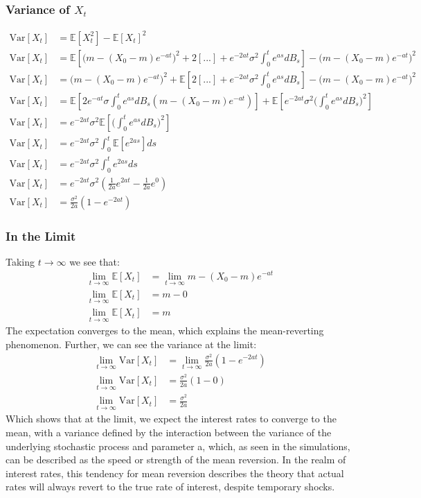 \documentclass[a4paper,12pt]{article}
\begin{document}
\subsubsection*{Variance of $X_t$}
\begin{align*}
\text{Var}[X_t] &= \mathbb{E}[X_t^2] - \mathbb{E}[X_t]^2 \\
\text{Var}[X_t] &= \mathbb{E}[\big( m - (X_0 - m) e^{-at} \big)^2 + 2[...] + e^{-2at}\sigma^2 \int_0^t e^{as}dB_s ] -  \big( m - (X_0 - m) e^{-at} \big)^2 \\
\text{Var}[X_t] &= \big( m - (X_0 - m) e^{-at} \big)^2 + \mathbb{E}[ 2[...] + e^{-2at}\sigma^2 \int_0^t e^{as}dB_s ] -  \big( m - (X_0 - m) e^{-at} \big)^2 \\
\text{Var}[X_t] &=  \mathbb{E}[ 2e^{-at}\sigma\int_0^te^{as}dB_s(m - (X_0 - m)e^{-at})] + \mathbb{E} [ e^{-2at}\sigma^2 \big( \int_0^t e^{as}dB_s\big)^2 ] \\
\text{Var}[X_t] &=  e^{-2at}\sigma^2 \mathbb{E} [\big( \int_0^t e^{as}dB_s\big)^2 ] \\
\text{Var}[X_t] &=  e^{-2at}\sigma^2 \int_0^t \mathbb{E} [e^{2as}]ds \\
\text{Var}[X_t] &=  e^{-2at}\sigma^2 \int_0^t e^{2as}ds \\
\text{Var}[X_t] &=  e^{-2at}\sigma^2 (\frac{1}{2a}e^{2at} - \frac{1}{2a}e^{0}) \\
\text{Var}[X_t] &=  \frac{\sigma^2}{2a}(1 - e^{-2at})
\end{align*}

\subsubsection*{In the Limit}
Taking $ t \rightarrow \infty$ we see that:
\begin{align*}
\lim_{t \rightarrow \infty} \mathbb{E}[X_t] &= \lim_{t \rightarrow \infty} m - (X_0 - m) e^{-at} \\
\lim_{t \rightarrow \infty} \mathbb{E}[X_t] &= m - 0 \\
\lim_{t \rightarrow \infty} \mathbb{E}[X_t] &= m
\end{align*}
The expectation converges to the mean, which explains the mean-reverting phenomenon. Further, we can see the variance at the limit:
\begin{align*}
\lim_{t \rightarrow \infty} \text{Var}[X_t] &=  \lim_{t \rightarrow \infty} \frac{\sigma^2}{2a}(1 - e^{-2at}) \\
\lim_{t \rightarrow \infty} \text{Var}[X_t] &=  \frac{\sigma^2}{2a}(1 - 0) \\
\lim_{t \rightarrow \infty} \text{Var}[X_t] &=  \frac{\sigma^2}{2a}
\end{align*}
%
Which shows that at the limit, we expect the interest rates to converge to the mean, with a variance defined by the interaction between the variance of the underlying stochastic process and parameter a, which, as seen in the simulations, can be described as the speed or strength of the mean reversion. In the realm of interest rates, this tendency for mean reversion describes the theory that actual rates will always revert to the true rate of interest, despite temporary shocks.
%
\end{document}
